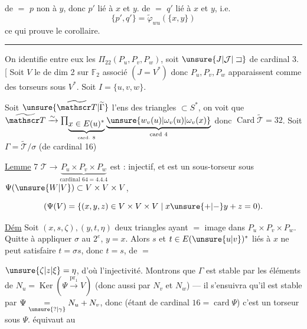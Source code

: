 de $=$ $p$ non  à $y$, donc $p'$ lié à $x$ et $y$. de $=$ $q'$ lié à $x$ et $y$, i.e.
\[
\{p',q'\}=\widetilde\varphi_{wu}(\{x,y\})
\]
ce qui prouve le corollaire.


\begin{center}\rule{2.2cm}{.35pt}\end{center}

On identifie entre eux les $\Pi_{22}(P_u,P_v,P_w)$, soit $\unsure{J|\mathcal J|\sqsupset}$ de cardinal 3. [ Soit $V$ le  de dim 2 sur $\mathbb F_2$ associé $(J=V^*)$ donc $P_u,P_v,P_w$ apparaissent comme des torseurs sous $V^*$. Soit $I=\{u,v,w\}$.

 Soit $\unsure{\widetilde{\mathscr T}|\widetilde\Gamma}$ l'ens des triangles $\subset S^*$, on voit que $\widetilde{\mathscr T}\xrightarrow{\sim}\prod_{\underbrace{x\in E(u)^*}_{\text{card. }8}}\underbrace{\unsure{w_v(u)|\omega_v(u)|\omega_v(x)}}_{\text{card }4}$ donc $\operatorname{Card}\widetilde{\mathscr T}=32$. Soit $\Gamma=\widetilde{\mathscr T}/\sigma$ (de cardinal 16)

\uline{Lemme} 7 $\mathscr T\longrightarrow\underbrace{P_u\times P_v\times P_w}_{\text{cardinal }64=4.4.4}$ est : injectif, et  est un sous-torseur sous $\Psi(\unsure{W|V})\subset V\times V\times V$,

\[
(\Psi(V)=\{(x,y,z)\in V\times V\times V\mid x\unsure{+|-}y+z=0).
\]

\uline{Dém} Soit $(x,s,\zeta),(y,t,\eta)$ deux triangles ayant $=$ image dans $P_u\times P_v\times P_w$. Quitte à appliquer $\sigma$ au $2^e$,  $y=x$. Alors $s$ et $t\in E(\unsure{u|v})^*$ liés à $x$ ne peut  satisfaire $t=\sigma s$, donc $t=s$, de $=$

$\unsure{\zeta|z|\xi}=\eta$, d'où l'injectivité. Montrons que $\Gamma$ est stable par les éléments de $N_u=\operatorname{Ker}(\Psi\xrightarrow{\mathrm{pr}_1}V)$ (donc aussi par $N_v$ et $N_w$) --- il s'ensuivra qu'il est stable par $\Psi\underset{\unsure{?|\gamma}}{=}N_u+N_v$, donc (étant de cardinal $16=\operatorname{card}\Psi$) c'est un torseur sous $\Psi$.  équivaut au

